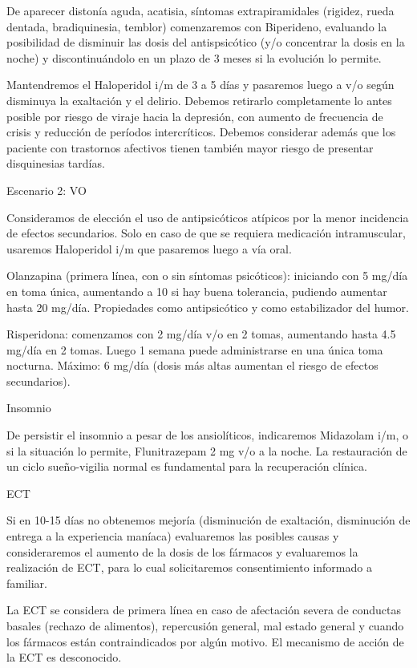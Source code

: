 \documentclass{scrbook}
\begin{document}
De aparecer distonía aguda, acatisia, síntomas extrapiramidales (rigidez, rueda dentada, bradiquinesia, temblor) comenzaremos con Biperideno, evaluando la posibilidad de disminuir las dosis del antispsicótico (y/o concentrar la dosis en la noche) y discontinuándolo en un plazo de 3 meses si la evolución lo permite.

Mantendremos el Haloperidol i/m de 3 a 5 días y pasaremos luego a v/o según disminuya la exaltación y el delirio. Debemos retirarlo completamente lo antes posible por riesgo de viraje hacia la depresión, con aumento de frecuencia de crisis y reducción de períodos intercríticos. Debemos considerar además que los paciente con trastornos afectivos tienen también mayor riesgo de presentar disquinesias tardías.

Escenario 2: VO

Consideramos de elección el uso de antipsicóticos atípicos por la menor incidencia de efectos secundarios. Solo en caso de que se requiera medicación intramuscular, usaremos Haloperidol i/m que pasaremos luego a vía oral.

Olanzapina (primera línea, con o sin síntomas psicóticos): iniciando con 5 mg/día en toma única, aumentando a 10 si hay buena tolerancia, pudiendo aumentar hasta 20 mg/día. Propiedades como antipsicótico y como estabilizador del humor.

Risperidona: comenzamos con 2 mg/día v/o en 2 tomas, aumentando hasta 4.5 mg/día en 2 tomas. Luego 1 semana puede administrarse en una única toma nocturna. Máximo: 6 mg/día (dosis más altas aumentan el riesgo de efectos secundarios).

\faMedkit Insomnio

De persistir el insomnio a pesar de los ansiolíticos, indicaremos Midazolam i/m, o si la situación lo permite, Flunitrazepam 2 mg v/o a la noche. La restauración de un ciclo sueño-vigilia normal es fundamental para la recuperación clínica.

\faBolt ECT

Si en 10-15 días no obtenemos mejoría (disminución de exaltación, disminución de entrega a la experiencia maníaca) evaluaremos las posibles causas y consideraremos el aumento de la dosis de los fármacos y evaluaremos la realización de ECT, para lo cual solicitaremos consentimiento informado a familiar.

La ECT se considera de primera línea en caso de afectación severa de conductas basales (rechazo de alimentos), repercusión general, mal estado general y cuando los fármacos están contraindicados por algún motivo. El mecanismo de acción de la ECT es desconocido.
\end{document}
